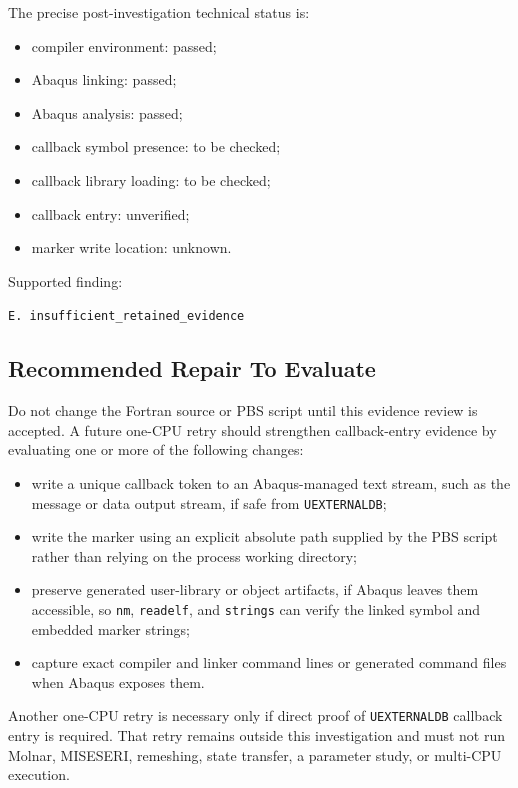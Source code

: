 \documentclass[11pt,a4paper]{article}
\begin{document}
The precise post-investigation technical status is:

\begin{itemize}
  \item compiler environment: passed;
  \item Abaqus linking: passed;
  \item Abaqus analysis: passed;
  \item callback symbol presence: to be checked;
  \item callback library loading: to be checked;
  \item callback entry: unverified;
  \item marker write location: unknown.
\end{itemize}

Supported finding:

\begin{center}
\texttt{E. insufficient\_retained\_evidence}
\end{center}

\subsection*{Recommended Repair To Evaluate}

Do not change the Fortran source or PBS script until this evidence review is accepted. A future one-CPU retry should strengthen callback-entry evidence by evaluating one or more of the following changes:

\begin{itemize}
  \item write a unique callback token to an Abaqus-managed text stream, such as the message or data output stream, if safe from \texttt{UEXTERNALDB};
  \item write the marker using an explicit absolute path supplied by the PBS script rather than relying on the process working directory;
  \item preserve generated user-library or object artifacts, if Abaqus leaves them accessible, so \texttt{nm}, \texttt{readelf}, and \texttt{strings} can verify the linked symbol and embedded marker strings;
  \item capture exact compiler and linker command lines or generated command files when Abaqus exposes them.
\end{itemize}

Another one-CPU retry is necessary only if direct proof of \texttt{UEXTERNALDB} callback entry is required. That retry remains outside this investigation and must not run Molnar, MISESERI, remeshing, state transfer, a parameter study, or multi-CPU execution.
\end{document}
